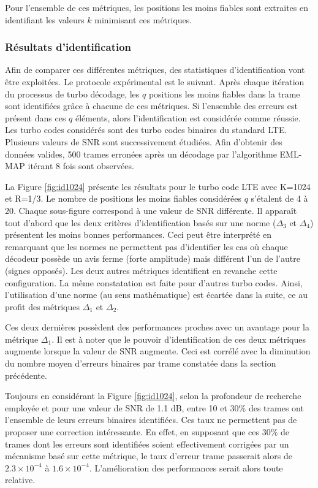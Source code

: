 Pour l'ensemble de ces métriques, les positions les moins fiables sont extraites en identifiant les valeurs $k$ minimisant
ces métriques.

\subsubsection{Résultats d'identification}
Afin de comparer ces différentes métriques, des statistiques d'identification vont être exploitées. Le protocole 
expérimental est le suivant. Après chaque itération du processus de turbo décodage, les $q$ positions les moins fiables
dans la trame sont identifiées grâce à chacune de ces métriques. Si l'ensemble des erreurs est présent dans ces $q$ éléments,
alors l'identification est considérée comme réussie. Les turbo codes considérés sont des turbo codes binaires du standard LTE.
Plusieurs valeurs de SNR sont successivement étudiées. Afin 
d'obtenir des données valides, 500 trames erronées après un décodage par l'algorithme EML-MAP itérant 8 fois sont
observées.

La Figure \ref{fig:id1024} présente les résultats pour le turbo code LTE avec K=1024 et R=1/3. Le nombre de positions les moins fiables
considérées $q$ s'étalent de 4 à 20. Chaque sous-figure correspond à une valeur de SNR différente. Il apparaît tout d'abord que 
les deux critères d'identification basés sur une norme ($\Delta_3$ et $\Delta_4$) présentent les moins bonnes performances.
 Ceci peut être interprété en remarquant que les normes ne permettent pas d'identifier les
cas où chaque décodeur possède un avis ferme (forte amplitude) mais différent l'un de l'autre (signes opposés). Les deux 
autres métriques identifient en revanche cette configuration. La même constatation est faite pour d'autres turbo codes. 
Ainsi, l'utilisation d'une norme (au sens mathématique) est écartée dans la suite, ce au profit des métriques $\Delta_1$ 
et $\Delta_2$.

Ces deux dernières possèdent des performances proches avec un avantage pour la métrique $\Delta_1$. Il est à noter que le pouvoir 
d'identification de ces deux métriques augmente lorsque la valeur de SNR augmente. Ceci est corrélé avec la diminution du 
nombre moyen d'erreurs binaires par trame constatée dans la section précédente.

Toujours en considérant la Figure \ref{fig:id1024}, selon la profondeur de recherche employée et pour une valeur de SNR 
de 1.1 dB, entre 10 et 30\% des trames ont l'ensemble de leurs erreurs binaires identifiées. Ces taux ne 
permettent pas de proposer une correction intéressante. En effet, en supposant que ces 30\% de trames dont les erreurs sont 
identifiées soient effectivement corrigées par un mécanisme basé sur cette métrique, le taux d'erreur trame passerait alors 
de $2.3\times 10^{-4}$ à $1.6\times 10^{-4}$. L'amélioration des performances serait alors toute relative.


